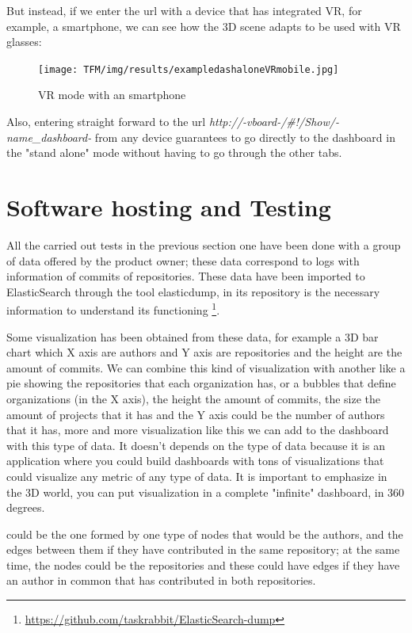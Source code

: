 \documentclass[a4paper, 12pt]{book}
\begin{document}
But instead, if we enter the url with a device that has integrated VR, for example, a smartphone, we can see how the 3D scene adapts to be used with VR glasses:

\begin{figure}[H]
  \centering
  \texttt{[image: TFM/img/results/exampledashaloneVRmobile.jpg]}
  \caption{VR mode with an smartphone}
  \label{fig:onlynodes}
\end{figure}
Also, entering straight forward to the url \textit{http://-vboard-/\#!/Show/-name\_dashboard-} from any device guarantees to go directly to the dashboard in the "stand alone" mode without having to go through the other tabs.


\section{Software hosting and Testing}
\label{sec:softhostest}

All the carried out tests in the previous section one have been done with a group of data offered by the product owner; these data correspond to logs with information of commits of repositories.
These data have been imported to ElasticSearch through the tool elasticdump, in its repository is the necessary information to understand its functioning \footnote{\url{https://github.com/taskrabbit/ElasticSearch-dump}}.

Some visualization has been obtained from these
data, for example a 3D bar chart which X axis are authors and Y axis are repositories and the height are the amount of commits. We can combine this kind of visualization with another like a pie showing the repositories that each organization has, or a bubbles that define organizations (in the X axis), the height the amount of commits, the size the amount of projects that it has and the Y axis could be the number of authors that it has, more and more visualization like this we can add to the dashboard with this type of data. It doesn't depends on the type of data because it is an application where you could build dashboards with tons of visualizations that could visualize any metric of any type of data. It is important to emphasize in the 3D world, you can put visualization in a complete "infinite" dashboard, in 360 degrees.

could be the one formed by one type of nodes that would be the authors, and the edges between them if they have contributed in the same repository; at the same time, the nodes could be the repositories and these could have edges if they have an author in common that has contributed in both repositories.\\
\end{document}
